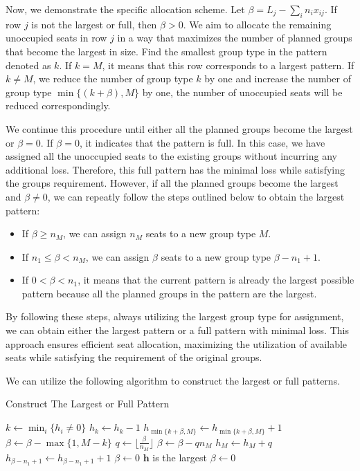 Now, we demonstrate the specific allocation scheme.
Let $\beta= L_{j} - \sum_{i} n_{i} x_{ij}$. If row $j$ is not the largest or full, then $\beta > 0$. 
We aim to allocate the remaining unoccupied seats in row $j$ in a way that maximizes the number of planned groups that become the largest in size. Find the smallest group type in the pattern denoted as $k$. If $k = M$, it means that this row corresponds to a largest pattern. If $k \neq M$, we reduce the number of group type $k$ by one and increase the number of group type $\min \{(k+\beta), M\}$ by one, the number of unoccupied seats will be reduced correspondingly.

We continue this procedure until either all the planned groups become the largest or $\beta = 0$. If $\beta = 0$, it indicates that the pattern is full. In this case, we have assigned all the unoccupied seats to the existing groups without incurring any additional loss. Therefore, this full pattern has the minimal loss while satisfying the groups requirement. However, if all the planned groups become the largest and $\beta \neq 0$, we can repeatly follow the steps outlined below to obtain the largest pattern:

\begin{itemize}
  \item If $\beta \geq n_{M}$, we can assign $n_M$ seats to a new group type $M$.

  \item If $n_{1} \leq \beta < n_{M}$, we can assign $\beta$ seats to a new group type $\beta-n_{1}+1$.
  \item If $0 < \beta < n_{1}$, it means that the current pattern is already the largest possible pattern because all the planned groups in the pattern are the largest.
\end{itemize}

By following these steps, always utilizing the largest group type for assignment, we can obtain either the largest pattern or a full pattern with minimal loss. This approach ensures efficient seat allocation, maximizing the utilization of available seats while satisfying the requirement of the original groups.

We can utilize the following algorithm to construct the largest or full patterns.

\begin{algorithm}
  \caption{Construct The Largest or Full Pattern}\label{construction}
    {$k \gets \min_{i}\{h_{i} \neq 0\}$
    {$h_{k} \gets h_{k} - 1$\; $h_{\min\{k+\beta, M\}} \gets h_{\min\{k+\beta, M\}} + 1$\;
    $\beta \gets \beta - \max\{1, M - k\}$}
    {
    {$q \gets \lfloor\frac{\beta}{n_M}\rfloor$\;
     $\beta \gets \beta - q n_M$\; $h_{M} \gets h_{M} + q$}
    {
    {$h_{\beta-n_1+1} \gets h_{\beta-n_1+1} + 1$\; $\beta \gets 0$\;}
    {$\bm{h}$ is the largest\; $\beta \gets 0$\;}}
    }}
\end{algorithm}

